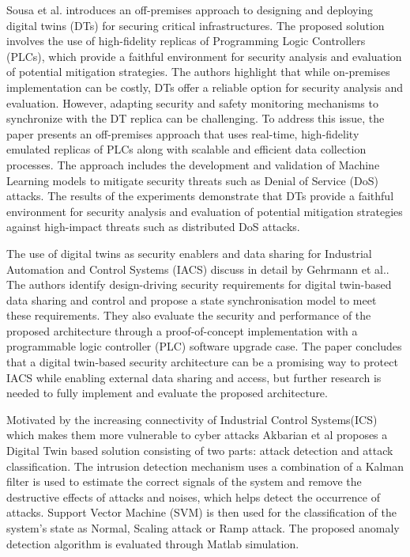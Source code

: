 Sousa et al.\cite{sousaELEGANTSecurityCritical2021} introduces an off-premises approach to designing and deploying digital twins (DTs) for securing critical infrastructures. The proposed solution involves the use of high-fidelity replicas of Programming Logic Controllers (PLCs), which provide a faithful environment for security analysis and evaluation of potential mitigation strategies. The authors highlight that while on-premises implementation can be costly, DTs offer a reliable option for security analysis and evaluation. However, adapting security and safety monitoring mechanisms to synchronize with the DT replica can be challenging. To address this issue, the paper presents an off-premises approach that uses real-time, high-fidelity emulated replicas of PLCs along with scalable and efficient data collection processes. The approach includes the development and validation of Machine Learning models to mitigate security threats such as Denial of Service (DoS) attacks. The results of the experiments demonstrate that DTs provide a faithful environment for security analysis and evaluation of potential mitigation strategies against high-impact threats such as distributed DoS attacks.

The use of digital twins as security enablers and data sharing for Industrial Automation and Control Systems (IACS) discuss in detail by Gehrmann et al.\cite{gehrmannDigitalTwinBased2020}. The authors identify design-driving security requirements for digital twin-based data sharing and control and propose a state synchronisation model to meet these requirements. They also evaluate the security and performance of the proposed architecture through a proof-of-concept implementation with a programmable logic controller (PLC) software upgrade case. The paper concludes that a digital twin-based security architecture can be a promising way to protect IACS while enabling external data sharing and access, but further research is needed to fully implement and evaluate the proposed architecture.

Motivated by the increasing connectivity of Industrial Control Systems(ICS) which makes them more vulnerable to cyber attacks Akbarian et al\cite{akbarianIntrusionDetectionDigital2020} proposes a Digital Twin based solution consisting of two parts: attack detection and attack classification. The intrusion detection mechanism uses a combination of a Kalman filter is used  to estimate the correct signals of the system and remove the destructive effects of attacks and noises, which helps detect the occurrence of attacks. Support Vector Machine (SVM) is then used for the classification of the system's state as Normal, Scaling attack or Ramp attack. The proposed anomaly detection algorithm is evaluated through Matlab simulation.

